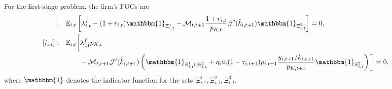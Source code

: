 \documentclass[12pt]{article}
\numberwithin{equation}{section}
\begin{document}
For the first-stage problem, the firm's FOCs are
\begin{align*}
    [b^f_{i,t}]: \quad &\mathbb{E}_{i,t}\left[\lambda^{f}_{i,t} - (1+r_{i,t})\mathbbm{1}_{\Xi^1_{i,t}} - \mathcal{M}_{t,t+1} \frac{1+r_{i,t}}{p_{K,t}} \mathcal{J}'(\tilde{k}_{i,t+1})\mathbbm{1}_{\Xi^2_{i,t}} \right] = 0, \\
    [i_{i,t}]: \quad &\mathbb{E}_{i,t}\bigg[\lambda^{f}_{i,t}p_{K,t} \\
    &\qquad - \mathcal{M}_{t,t+1} \mathcal{J}'(\tilde{k}_{i, t+1})\left(\mathbbm{1}_{\Xi^1_{i,t} \cup \Xi^2_{i,t}} + \eta_i a_i(1-\tau_{i,t+1})p_{i,t+1}\frac{y_{i,t+1}/k_{i,t+1}}{p_{K,t+1}}\mathbbm{1}_{\Xi^2_{i,t}}\right)\bigg] = 0,
\end{align*}
where $\mathbbm{1}$ denotes the indicator function for the sets $\Xi^1_{i,t}, \Xi^2_{i,t}, \Xi^3_{i,t}$. 
\end{document}
